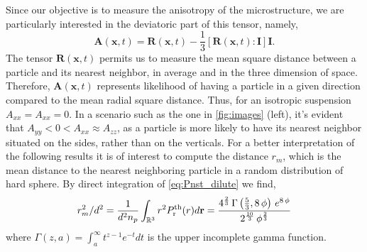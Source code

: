 Since our objective is to measure the anisotropy of the microstructure, we are particularly interested in the deviatoric part of this tensor, namely,
\begin{equation*}
    \textbf{A}(\textbf{x},t) = \textbf{R}(\textbf{x},t) - \frac{1}{3} [\textbf{R}(\textbf{x},t) : \textbf{I}] \textbf{I}.
\end{equation*}
The tensor $\textbf{R}(\textbf{x},t)$ permits us to measure the mean square distance between a particle and its nearest neighbor, in average and in the three dimension of space. 
Therefore, $\textbf{A}(\textbf{x},t)$ represents likelihood of having a particle in a given direction compared to the mean radial square distance. 
Thus, for an isotropic suspension $A_{xx} = A_{xx} = 0$. 
In a scenario such as the one in \ref{fig:images} (left), it's evident that $A_{yy} < 0 < A_{xx} \approx A_{zz}$, as a particle is more likely to have its nearest neighbor situated on the sides, rather than on the verticals.
For a better interpretation of the following results it is of interest to compute the distance $r_m$, which is the mean distance to the nearest neighboring particle in a random distribution of hard sphere. 
By direct integration of \ref{eq:Pnst_dilute} we find, 
\begin{equation*}
    r_m^2 /d^2
    = \frac{1}{d^2n_p} 
    \int_{\mathbb{R}^3} r^2 P_\text{r}^\text{th}(r) d\textbf{r} 
    = {{4^{{{2}\over{3}}}\,\Gamma\left({{5}\over{3}} , 8\,\phi\right)
    \,e^{8\,\phi}}\over{2^{{{10}\over{3}}}\,\phi^{{{2}\over{3}}}}}
\end{equation*}
where $\Gamma(z,a) = \int_a^\infty t^{z-1} e^{-t} dt$ is the upper incomplete gamma function. 

